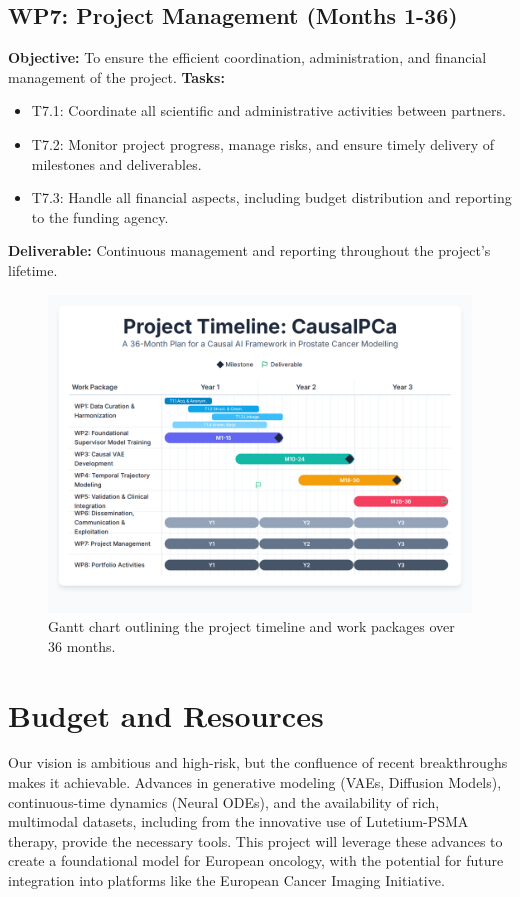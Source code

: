 \documentclass[11pt, a4paper]{article}
\begin{document}
\subsection*{WP7: Project Management (Months 1-36)}
\textbf{Objective:} To ensure the efficient coordination, administration, and financial management of the project.
\textbf{Tasks:}
\begin{itemize}
    \item T7.1: Coordinate all scientific and administrative activities between partners.
    \item T7.2: Monitor project progress, manage risks, and ensure timely delivery of milestones and deliverables.
    \item T7.3: Handle all financial aspects, including budget distribution and reporting to the funding agency.
\end{itemize}
\textbf{Deliverable:} Continuous management and reporting throughout the project's lifetime.

\begin{figure}[H]
    \centering
    \includegraphics[width=1\textwidth]{gantt.png}
    \caption{Gantt chart outlining the project timeline and work packages over 36 months.}
    \label{fig:gantt_chart}
\end{figure}

\section{Budget and Resources}


Our vision is ambitious and high-risk, but the confluence of recent breakthroughs makes it achievable. Advances in generative modeling (VAEs, Diffusion Models), continuous-time dynamics (Neural ODEs), and the availability of rich, multimodal datasets, including from the innovative use of Lutetium-PSMA therapy, provide the necessary tools. This project will leverage these advances to create a foundational model for European oncology, with the potential for future integration into platforms like the European Cancer Imaging Initiative.
\end{document}
